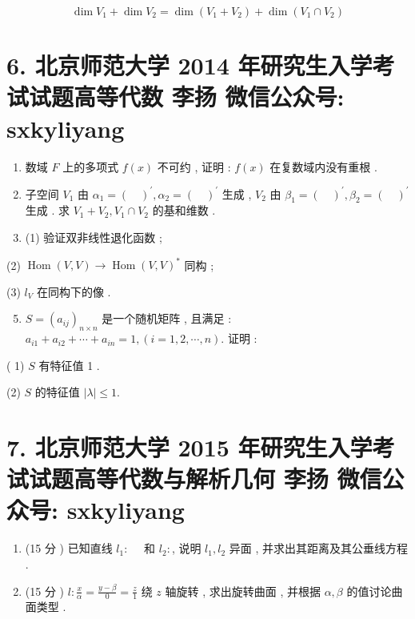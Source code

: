 \documentclass[10pt]{article}
\begin{document}
{\begin{enumerate}
\end{enumerate}
$$
\operatorname{dim} V_{1}+\operatorname{dim} V_{2}=\operatorname{dim}\left(V_{1}+V_{2}\right)+\operatorname{dim}\left(V_{1} \cap V_{2}\right)
$$

\section{6. 北京师范大学 2014 年研究生入学考试试题高等代数 
 李扬 
 微信公众号: sxkyliyang}
\begin{enumerate}
  \item  数域  $F$  上的多项式  $f(x)$  不可约 ,  证明 : $f(x)$  在复数域内没有重根 .

  \item  子空间  $V_{1}$  由  $\alpha_{1}=(\quad)^{\prime}, \alpha_{2}=(\quad)^{\prime}$  生成 , $V_{2}$  由  $\beta_{1}=(\quad)^{\prime}, \beta_{2}=(\quad)^{\prime}$  生成 .  求  $V_{1}+V_{2}, V_{1} \cap V_{2}$  的基和维数 .

  \item (1)  验证双非线性退化函数 ;

\end{enumerate}
(2) $\operatorname{Hom}(V, V) \rightarrow \operatorname{Hom}(V, V)^{*}$  同构 ;

(3) $l_{V}$  在同构下的像 .

\begin{enumerate}
  \setcounter{enumi}{4}
  \item $S=\left(a_{i j}\right)_{n \times n}$  是一个随机矩阵 ,  且满足 : $a_{i 1}+a_{i 2}+\cdots+a_{i n}=1,(i=1,2, \cdots, n)$.  证明 :
\end{enumerate}
( 1) $S$  有特征值  1 .

(2) $S$  的特征值  $|\lambda| \leqslant 1$.

\section{7. 北京师范大学 2015 年研究生入学考试试题高等代数与解析几何 
 李扬 
 微信公众号: sxkyliyang}
\begin{enumerate}
  \item (15  分 )  已知直线  $l_{1}: \quad$  和  $l_{2}:$,  说明  $l_{1}, l_{2}$  异面 ,  并求出其距离及其公垂线方程 .

  \item (15  分 ) $l: \frac{x}{\alpha}=\frac{y-\beta}{0}=\frac{z}{1}$  绕  $z$  轴旋转 ,  求出旋转曲面 ,  并根据  $\alpha, \beta$  的值讨论曲面类型 .


\end{enumerate}}
\end{document}
